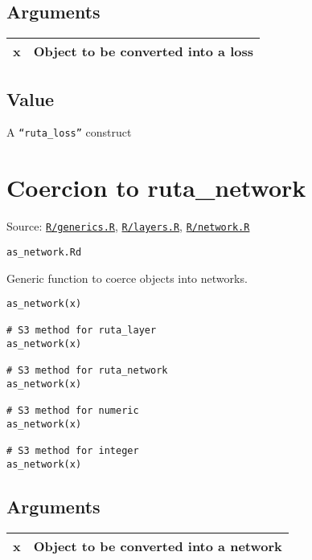 \hypertarget{arguments}{\subsection{\texorpdfstring{\protect\hyperlink{arguments}{}Arguments}{Arguments}}\label{arguments}}

\begin{longtable}[c]{@{}>{\small}p{3cm}>{\raggedright}p{12.5cm}@{}}
\toprule
x & Object to be converted into a loss\tabularnewline
\bottomrule
\end{longtable}

\hypertarget{value}{\subsection{\texorpdfstring{\protect\hyperlink{value}{}Value}{Value}}\label{value}}

A \texttt{``ruta\_loss''} construct

\section{Coercion to ruta\_network}\label{coercion-to-rutaux5fnetwork}

Source:
\href{https://github.com/fdavidcl/ruta/blob/master/R/generics.R}{\texttt{R/generics.R}},
\href{https://github.com/fdavidcl/ruta/blob/master/R/layers.R}{\texttt{R/layers.R}},
\href{https://github.com/fdavidcl/ruta/blob/master/R/network.R}{\texttt{R/network.R}}

\texttt{as\_network.Rd}

Generic function to coerce objects into networks.

\begin{verbatim}
as_network(x)

# S3 method for ruta_layer
as_network(x)

# S3 method for ruta_network
as_network(x)

# S3 method for numeric
as_network(x)

# S3 method for integer
as_network(x)
\end{verbatim}

\hypertarget{arguments}{\subsection{\texorpdfstring{\protect\hyperlink{arguments}{}Arguments}{Arguments}}\label{arguments}}

\begin{longtable}[c]{@{}>{\small}p{3cm}>{\raggedright}p{12.5cm}@{}}
\toprule
x & Object to be converted into a network\tabularnewline
\bottomrule
\end{longtable}

